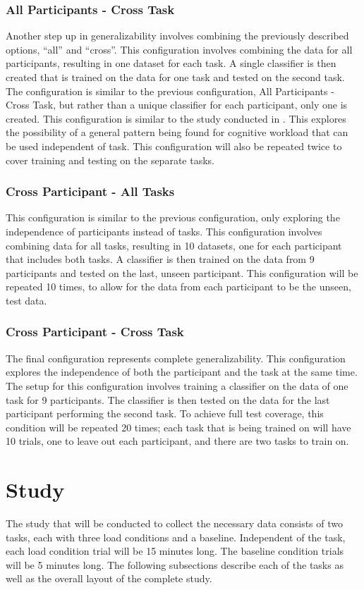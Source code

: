 \documentclass[11pt]{artikel3}
\begin{document}
\subsubsection{All Participants - Cross Task}
Another step up in generalizability involves combining the previously described options, “all” and “cross”. This configuration involves combining the data for all participants, resulting in one dataset for each task. A single classifier is then created that is trained on the data for one task and tested on the second task. The configuration is similar to the previous configuration, All Participants - Cross Task, but rather than a unique classifier for each participant, only one is created. This configuration is similar to the study conducted in \cite{Ke}. This explores the possibility of a general pattern being found for cognitive workload that can be used independent of task. This configuration will also be repeated twice to cover training and testing on the separate tasks.

\subsubsection{Cross Participant - All Tasks}
This configuration is similar to the previous configuration, only exploring the independence of participants instead of tasks. This configuration involves combining data for all tasks, resulting in 10 datasets, one for each participant that includes both tasks. A classifier is then trained on the data from 9 participants and tested on the last, unseen participant. This configuration will be repeated 10 times, to allow for the data from each participant to be the unseen, test data. 

\subsubsection{Cross Participant - Cross Task}
The final configuration represents complete generalizability. This configuration explores the independence of both the participant and the task at the same time. The setup for this configuration involves training a classifier on the data of one task for 9 participants. The classifier is then tested on the data for the last participant performing the second task. To achieve full test coverage, this condition will be repeated 20 times; each task that is being trained on will have 10 trials, one to leave out each participant, and there are two tasks to train on.


\section{Study}
The study that will be conducted to collect the necessary data consists of two tasks, each with three load conditions and a baseline. Independent of the task, each load condition trial will be 15 minutes long. The baseline condition trials will be 5 minutes long. The following subsections describe each of the tasks as well as the overall layout of the complete study. 
\end{document}
